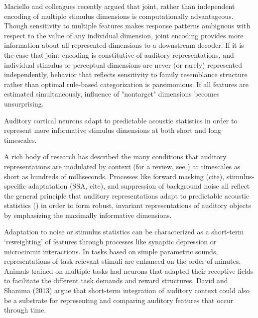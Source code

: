 Maciello and colleagues recently argued that joint, rather than independent encoding of multiple stimulus dimensions is computationally advantageous\cite{macellaioWhySensoryNeurons2020}. Though sensitivity to multiple features makes response patterns ambiguous with respect to the value of any individual dimension, joint encoding provides more information about all represented dimensions to a downstream decoder. If it is the case that joint encoding is constitutive of auditory representations, and individual stimulus or perceptual dimensions are never (or rarely) represented independently, behavior that reflects sensitivity to family resemblance structure rather than optimal rule-based categorization is parsimonious. If all features are estimated simultaneously, influence of "nontarget" dimensions becomes unsurprising. 

Auditory cortical neurons adapt to predictable acoustic statistics in order to represent more informative stimulus dimensions at both short and long timescales. 

A rich body of research has described the many conditions that auditory representations are modulated by context (for a review, see \cite{angeloniContextualModulationSound2018}) at timescales as short as hundreds of milliseconds\cite{deanRapidNeuralAdaptation2008b,rabinowitzContrastGainControl2011c}. Processes like forward masking (cite), stimulus-specific adaptatation (SSA, cite), and suppression of background noise all reflect the general principle that auditory representations adapt to predictable acoustic statistics () in order to form robust, invariant representations of auditory objects\cite{rabinowitzConstructingNoiseinvariantRepresentations2013} by emphasizing the maximally informative dimensions\cite{atencioMultidimensionalReceptiveField2017}. 

Adaptation to noise or stimulus statistics can be characterized as a short-term `reweighting' of features through processes like synaptic depression\cite{mesgaraniMechanismsNoiseRobust2014,davidRapidSynapticDepression2009} or microcircuit interactions\cite{natanComplementaryControlSensory2015b,natanCorticalInterneuronsDifferentially2017}. In tasks based on simple parametric sounds, representations of task-relevant stimuli are enhanced on the order of minutes\cite{fritzRapidTaskrelatedPlasticity2003a}. Animals trained on multiple tasks had neurons that adapted their receptive fields to facilitate the different task demands\cite{fritzActiveListeningTaskdependent2005b} and reward structures\cite{davidTaskRewardStructure2012}. David and Shamma (2013\cite{davidIntegrationMultipleTimescales2013}) argue that short-term integration of auditory context could also be a substrate for representing and comparing auditory features that occur through time. 

